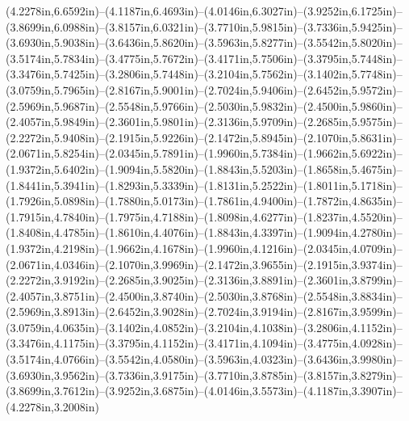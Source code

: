 (4.2278in,6.6592in)--(4.1187in,6.4693in)--(4.0146in,6.3027in)--(3.9252in,6.1725in)--(3.8699in,6.0988in)--(3.8157in,6.0321in)--(3.7710in,5.9815in)--(3.7336in,5.9425in)--(3.6930in,5.9038in)--(3.6436in,5.8620in)--(3.5963in,5.8277in)--(3.5542in,5.8020in)--(3.5174in,5.7834in)--(3.4775in,5.7672in)--(3.4171in,5.7506in)--(3.3795in,5.7448in)--(3.3476in,5.7425in)--(3.2806in,5.7448in)--(3.2104in,5.7562in)--(3.1402in,5.7748in)--(3.0759in,5.7965in)--(2.8167in,5.9001in)--(2.7024in,5.9406in)--(2.6452in,5.9572in)--(2.5969in,5.9687in)--(2.5548in,5.9766in)--(2.5030in,5.9832in)--(2.4500in,5.9860in)--(2.4057in,5.9849in)--(2.3601in,5.9801in)--(2.3136in,5.9709in)--(2.2685in,5.9575in)--(2.2272in,5.9408in)--(2.1915in,5.9226in)--(2.1472in,5.8945in)--(2.1070in,5.8631in)--(2.0671in,5.8254in)--(2.0345in,5.7891in)--(1.9960in,5.7384in)--(1.9662in,5.6922in)--(1.9372in,5.6402in)--(1.9094in,5.5820in)--(1.8843in,5.5203in)--(1.8658in,5.4675in)--(1.8441in,5.3941in)--(1.8293in,5.3339in)--(1.8131in,5.2522in)--(1.8011in,5.1718in)--(1.7926in,5.0898in)--(1.7880in,5.0173in)--(1.7861in,4.9400in)--(1.7872in,4.8635in)--(1.7915in,4.7840in)--(1.7975in,4.7188in)--(1.8098in,4.6277in)--(1.8237in,4.5520in)--(1.8408in,4.4785in)--(1.8610in,4.4076in)--(1.8843in,4.3397in)--(1.9094in,4.2780in)--(1.9372in,4.2198in)--(1.9662in,4.1678in)--(1.9960in,4.1216in)--(2.0345in,4.0709in)--(2.0671in,4.0346in)--(2.1070in,3.9969in)--(2.1472in,3.9655in)--(2.1915in,3.9374in)--(2.2272in,3.9192in)--(2.2685in,3.9025in)--(2.3136in,3.8891in)--(2.3601in,3.8799in)--(2.4057in,3.8751in)--(2.4500in,3.8740in)--(2.5030in,3.8768in)--(2.5548in,3.8834in)--(2.5969in,3.8913in)--(2.6452in,3.9028in)--(2.7024in,3.9194in)--(2.8167in,3.9599in)--(3.0759in,4.0635in)--(3.1402in,4.0852in)--(3.2104in,4.1038in)--(3.2806in,4.1152in)--(3.3476in,4.1175in)--(3.3795in,4.1152in)--(3.4171in,4.1094in)--(3.4775in,4.0928in)--(3.5174in,4.0766in)--(3.5542in,4.0580in)--(3.5963in,4.0323in)--(3.6436in,3.9980in)--(3.6930in,3.9562in)--(3.7336in,3.9175in)--(3.7710in,3.8785in)--(3.8157in,3.8279in)--(3.8699in,3.7612in)--(3.9252in,3.6875in)--(4.0146in,3.5573in)--(4.1187in,3.3907in)--(4.2278in,3.2008in) 